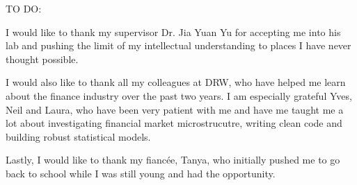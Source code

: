 \begin{acknowledgments}
  TO DO:
  
  I would like to thank my supervisor Dr. Jia Yuan Yu for accepting me into his lab and pushing the limit of my intellectual understanding to places I have never thought possible. 
  
  I would also like to thank all my colleagues at DRW, who have helped me learn about the finance industry over the past two years. I am especially grateful Yves, Neil and Laura, who have been very patient with me and have me taught me a lot about investigating financial market microstrucutre, writing clean code and building robust statistical models.
  
  Lastly, I would like to thank my fiancée, Tanya, who initially pushed me to go back to school while I was still young and had the opportunity. 
\end{acknowledgments}